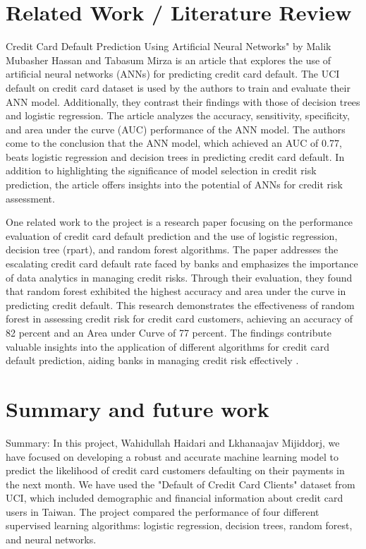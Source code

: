 \documentclass[nohyperref]{article}
\theoremstyle{plain}
\theoremstyle{definition}
\theoremstyle{remark}
\begin{document}
\section{Related Work / Literature Review}
Credit Card Default Prediction Using Artificial Neural Networks" by Malik Mubasher Hassan and Tabasum Mirza is an article that explores the use of artificial neural networks (ANNs) for predicting credit card default. The UCI default on credit card dataset is used by the authors to train and evaluate their ANN model. Additionally, they contrast their findings with those of decision trees and logistic regression. The article analyzes the accuracy, sensitivity, specificity, and area under the curve (AUC) performance of the ANN model. The authors come to the conclusion that the ANN model, which achieved an AUC of 0.77, beats logistic regression and decision trees in predicting credit card default. In addition to highlighting the significance of model selection in credit risk prediction, the article offers insights into the potential of ANNs for credit risk assessment\cite{article}.

One related work to the project is a research paper focusing on the performance evaluation of credit card default prediction and the use of logistic regression, decision tree (rpart), and random forest algorithms. The paper addresses the escalating credit card default rate faced by banks and emphasizes the importance of data analytics in managing credit risks. Through their evaluation, they found that random forest exhibited the highest accuracy and area under the curve in predicting credit default. This research demonstrates the effectiveness of random forest in assessing credit risk for credit card customers, achieving an accuracy of 82 percent and an Area under Curve of 77 percent. The findings contribute valuable insights into the application of different algorithms for credit card default prediction, aiding banks in managing credit risk effectively \cite{8776802}.


\section{Summary and future work}
Summary:
In this project, Wahidullah Haidari and Lkhanaajav Mijiddorj, we have focused on developing a robust and accurate machine learning model to predict the likelihood of credit card customers defaulting on their payments in the next month. We have used the "Default of Credit Card Clients" dataset from UCI, which included demographic and financial information about credit card users in Taiwan. The project compared the performance of four different supervised learning algorithms: logistic regression, decision trees, random forest, and neural networks.
\end{document}
